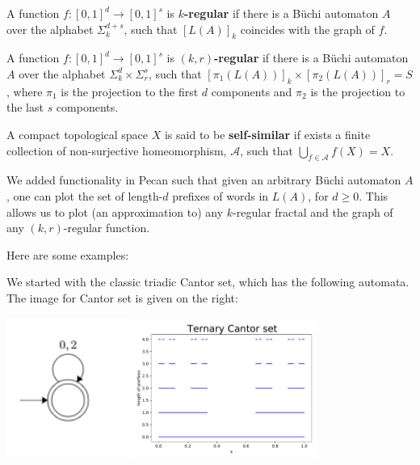 \documentclass[10pt,usenames,dvipsnames]{article}
\begin{document}
\begin{definition}
A function $f: [0, 1]^d \to [0, 1]^s$ is \textbf{$k$-regular} if there is a B\"uchi automaton $A$
over the alphabet $\Sigma^{d + s}_k$, such that $[L(A)]_k$ coincides with the graph of $f$.
\end{definition}

\begin{definition}
A function $f: [0, 1]^d \to [0, 1]^s$ is \textbf{$(k, r)$-regular} if there is a B\"uchi automaton $A$
over the alphabet $\Sigma^d_k \times \Sigma^s_r$, such that $[\pi_1(L(A))]_k \times [\pi_2(L(A))]_r = S$,
where $\pi_1$ is the projection to the first $d$ components and $\pi_2$ is the projection to the
last $s$ components. 
\end{definition}

\begin{definition}
A compact topological space $X$ is said to be \textbf{self-similar} if exists a finite collection of non-surjective homeomorphism, $\mathcal{A}$, such that $\bigcup_{f\in\mathcal{A}}f(X) = X$.
\end{definition}

We added functionality in Pecan such that given an arbitrary B\"uchi automaton $A$,
one can plot the set of length-$d$ prefixes of words in $L(A)$, for $d \ge 0$.
This allows us to plot (an approximation to) any $k$-regular fractal and
the graph of any $(k, r)$-regular function.

Here are some examples:

We started with the classic triadic Cantor set, which has the following automata. The image for Cantor set is given on the right:

\begin{center}
    \includegraphics[width=4cm]{FA20/images/fractals/cantor-automata.png}
    \includegraphics[width=6cm]{FA20/images/fractals/cantor3.pdf}
\end{center}
\end{document}
